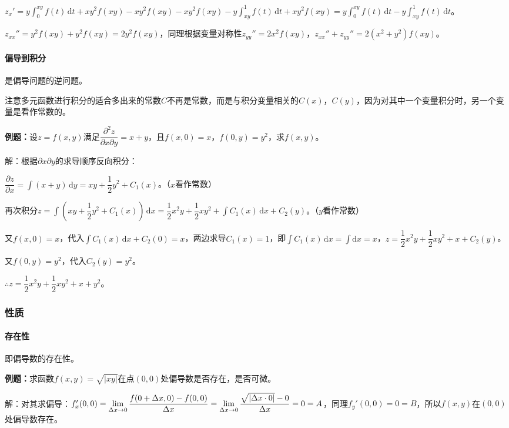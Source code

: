 \documentclass[UTF8, 12pt]{ctexart}
\begin{document}
$z_x'=y\int_0^{xy}f(t)\,\textrm{d}t+xy^2f(xy)-xy^2f(xy)-xy^2f(xy)-y\int_{xy}^1f(t)\,\textrm{d}t+xy^2f(xy)=y\int_0^{xy}f(t)\,\textrm{d}t-y\int_{xy}^1f(t)\,\textrm{d}t$。

$z_{xx}''=y^2f(xy)+y^2f(xy)=2y^2f(xy)$，同理根据变量对称性$z_{yy}''=2x^2f(xy)$，$z_{xx}''+z_{yy}''=2(x^2+y^2)f(xy)$。

\paragraph{偏导到积分} \leavevmode \medskip

是偏导问题的逆问题。

注意多元函数进行积分的适合多出来的常数$C$不再是常数，而是与积分变量相关的$C(x)$，$C(y)$，因为对其中一个变量积分时，另一个变量是看作常数的。

\textbf{例题：}设$z=f(x,y)$满足$\dfrac{\partial^2z}{\partial x\partial y}=x+y$，且$f(x,0)=x$，$f(0,y)=y^2$，求$f(x,y)$。

解：根据$\partial x\partial y$的求导顺序反向积分：

$\dfrac{\partial z}{\partial x}=\int(x+y)\,\textrm{d}y=xy+\dfrac{1}{2}y^2+C_1(x)$。（$x$看作常数）

再次积分$z=\displaystyle{\int\left(xy+\dfrac{1}{2}y^2+C_1(x)\right)\,\textrm{d}x}=\dfrac{1}{2}x^2y+\dfrac{1}{2}xy^2+\int C_1(x)\,\textrm{d}x+C_2(y)$。（$y$看作常数）

又$f(x,0)=x$，代入$\int C_1(x)\,\textrm{d}x+C_2(0)=x$，两边求导$C_1(x)=1$，即$\int C_1(x)\,\textrm{d}x=\int\textrm{d}x=x$，$z=\dfrac{1}{2}x^2y+\dfrac{1}{2}xy^2+x+C_2(y)$。

又$f(0,y)=y^2$，代入$C_2(y)=y^2$。

$\therefore z=\dfrac{1}{2}x^2y+\dfrac{1}{2}xy^2+x+y^2$。

\subsubsection{性质}

\paragraph{存在性} \leavevmode \medskip

即偏导数的存在性。

\textbf{例题：}求函数$f(x,y)=\sqrt{\vert xy\vert}$在点$(0,0)$处偏导数是否存在，是否可微。

解：对其求偏导：$f_x'(0,0)=\lim\limits_{\Delta x\to0}\dfrac{f(0+\Delta x,0)-f(0,0)}{\Delta x}=\lim\limits_{\Delta x\to0}\dfrac{\sqrt{\vert\Delta x\cdot0\vert}-0}{\Delta x}\\=0=A$，同理$f_y'(0,0)=0=B$，所以$f(x,y)$在$(0,0)$处偏导数存在。
\end{document}
